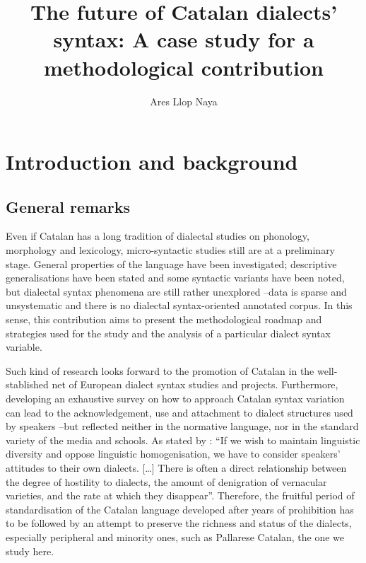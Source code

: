\documentclass[output=paper]{LSP/langsci}
\title{The future of {C}atalan dialects’ syntax: {A} case study for a methodological contribution}
\author{Ares Llop Naya\affiliation{Universitat Autònoma de Barcelona}}
\begin{document}
 

\section{Introduction and background}

\subsection{General remarks}
Even if Catalan has a long tradition of dialectal studies on phonology, morphology and lexicology, micro-syntactic studies still are at a preliminary stage. General properties of the language have been investigated; descriptive generalisations have been stated and some syntactic variants have been noted, but dialectal syntax phenomena are still rather unexplored –data is sparse and unsystematic and there is no dialectal syntax-oriented annotated corpus. In this sense, this contribution aims to present the methodological roadmap and strategies used for the study and the analysis of a particular dialect syntax variable.

Such kind of research looks forward to the promotion of Catalan in the well-stablished net of European dialect syntax studies and projects. Furthermore, developing an exhaustive survey on how to approach Catalan syntax variation can lead to the acknowledgement, use and attachment to dialect structures used by speakers –but reflected neither in the normative language, nor in the standard variety of the media and schools. As stated by \citet[30]{trudgill_sociolinguistic_2002}: “If we wish to maintain linguistic diversity and oppose linguistic homogenisation, we have to consider speakers’ attitudes to their own dialects. […] There is often a direct relationship between the degree of hostility to dialects, the amount of denigration of vernacular varieties, and the rate at which they disappear”. Therefore, the fruitful period of standardisation of the Catalan language developed after years of prohibition has to be followed by an attempt to preserve the richness and status of the dialects, especially peripheral and minority ones, such as Pallarese Catalan, the one we study here.
\end{document}
